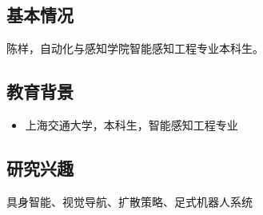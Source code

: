 
\begin{resume}
  \subsection*{基本情况}
    陈样，自动化与感知学院智能感知工程专业本科生。

  \subsection*{教育背景}
  \begin{itemize}
    \item 上海交通大学，本科生，智能感知工程专业
  \end{itemize}

  \subsection*{研究兴趣}
    具身智能、视觉导航、扩散策略、足式机器人系统

\end{resume}
